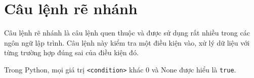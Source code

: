 \section{Câu lệnh rẽ nhánh}
\label{condition}
Câu lệnh rẽ nhánh là câu lệnh quen thuộc và được sử dụng rất nhiều trong các ngôn ngữ lập trình. Câu lệnh này kiểm tra một điều kiện vào, xử lý dữ liệu với từng trường hợp đúng sai của điều kiện đó.\par
Trong Python, mọi giá trị \texttt{<condition>} khác 0 và None được hiểu là \texttt{true}.




\newpage